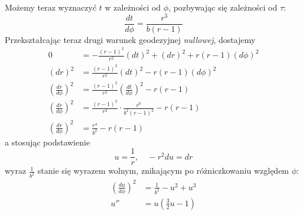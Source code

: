 Możemy teraz wyznaczyć $t$ w zależności od $\phi$, pozbywając się zależności od $\tau$:
$$\frac{dt}{d\phi}=\frac{r^3}{b(r-1)}$$
Przekształcając teraz drugi warunek geodezyjnej \emph{nullowej}, dostajemy
\begin{align*}
  0&=-\frac{(r-1)^2}{r^2}(dt)^2+(dr)^2+r(r-1)(d\phi)^2\\ 
  (dr)^2&=\frac{(r-1)^2}{r^2}(dt)^2-r(r-1)(d\phi)^2\\ 
  \left(\frac{dr}{d\phi}\right)^2&=\frac{(r-1)^2}{r^2}\left(\frac{dt}{d\phi}\right)^2-r(r-1)\\ 
  \left(\frac{dr}{d\phi}\right)^2&=\frac{(r-1)^2}{r^2}\cdot\frac{r^6}{b^2(r-1)^2}-r(r-1)\\ 
  \left(\frac{dr}{d\phi}\right)^2&=\frac{r^4}{b^2}-r(r-1)
\end{align*}
a stosując podstawienie 
$$u=\frac{1}{r},\quad -r^2du=dr$$
wyraz $\frac{1}{b^2}$ stanie się wyrazem wolnym, znikającym po różniczkowaniu względem $\phi$:
\begin{align*}
  \left(\frac{du}{d\phi}\right)^2&=\frac{1}{b^2}-u^2+u^3\\ 
  u'' &=u\left(\frac{3}{2}u-1\right)
\end{align*}





